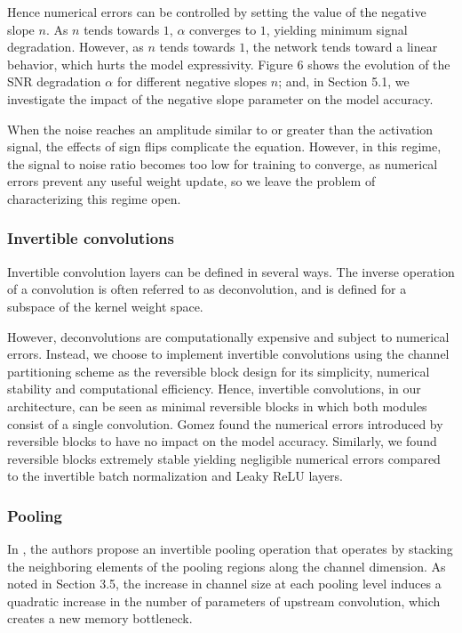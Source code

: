 \documentclass[twocolumn]{bmcart}
\begin{document}
Hence numerical errors can be controlled by setting the value of the negative slope $n$.
As $n$ tends towards $1$, $\alpha$ converges to $1$, yielding minimum signal degradation.
However, as $n$ tends towards $1$, the network tends toward a linear behavior, which hurts the model expressivity.
Figure 6 shows the evolution of the SNR degradation $\alpha$ for different negative slopes $n$;
and, in Section 5.1, we investigate the impact of the negative slope parameter on the model accuracy.

When the noise reaches an amplitude similar to or greater than the activation signal,
the effects of sign flips complicate the equation.
However, in this regime, the signal to noise ratio becomes too low for training to converge,
as numerical errors prevent any useful weight update, so we leave the problem of characterizing this regime open.

\subsubsection{Invertible convolutions}

Invertible convolution layers can be defined in several ways.
The inverse operation of a convolution is often referred to as deconvolution,
and is defined for a subspace of the kernel weight space.

However, deconvolutions are computationally expensive and subject to numerical errors.
Instead, we choose to implement invertible convolutions using the channel partitioning scheme as the reversible block design for its simplicity,
numerical stability and computational efficiency.
Hence, invertible convolutions, in our architecture, can be seen as minimal reversible blocks
 in which both modules consist of a single convolution.
Gomez \etal \cite{gomez2017reversible} found the numerical errors introduced by reversible blocks to have no impact on the model accuracy.
Similarly, we found reversible blocks extremely stable yielding negligible numerical errors
compared to the invertible batch normalization and Leaky ReLU layers.

\subsubsection{Pooling}

In \cite{jacobsen2018revnet}, the authors propose an invertible pooling operation that operates
by stacking the neighboring elements of the pooling regions along the channel dimension.
As noted in Section 3.5, the increase in channel size at each pooling level
induces a quadratic increase in the number of parameters of upstream convolution, which creates a new memory bottleneck.
\end{document}

